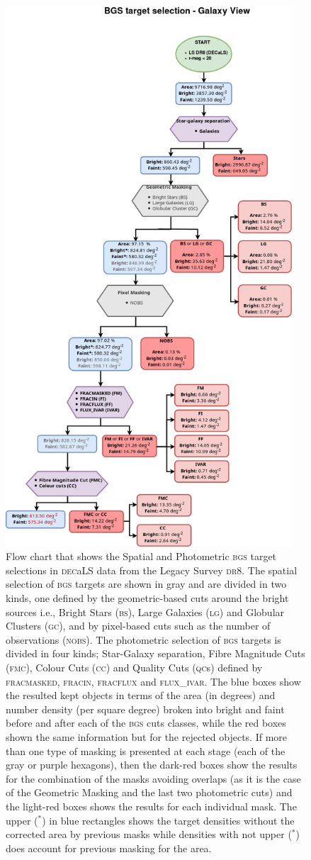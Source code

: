 \documentclass[fleqn,usenatbib]{mnras}
\newcommand{\BGS}{\textsc{bgs}\xspace}
\newcommand{\BS}{\textsc{bs}\xspace}
\newcommand{\CC}{\textsc{cc}\xspace}
\newcommand{\DECaLS}{\textsc{dec}a\textsc{LS}\xspace}
\newcommand{\DReight}{\textsc{dr8}\xspace}
\newcommand{\FLUXIVAR}{{\textsc{ flux\_ivar}}\xspace}
\newcommand{\FMC}{{\textsc{fmc}}\xspace}
\newcommand{\FRACMASKED}{{\textsc{fracmasked}}\xspace}
\newcommand{\FRACFLUX}{{\textsc{fracflux}}\xspace}
\newcommand{\FRACIN}{{\textsc{fracin}}\xspace}
\newcommand{\GC}{\textsc{gc}\xspace}
\newcommand{\LG}{\textsc{lg}\xspace}
\newcommand{\NOBS}{\textsc{nobs}\xspace}
\newcommand{\QCs}{\textsc{qc}s\xspace}
\begin{document}
\begin{figure}
	\includegraphics[width=10.7cm]{images/flow_galaxy.png}
    \caption{Flow chart that shows the Spatial and Photometric \BGS target selections in \DECaLS data from the Legacy Survey \DReight. The spatial selection of \BGS targets are shown in gray and are divided in two kinds, one defined by the geometric-based cuts around the bright sources i.e., Bright Stars (\BS), Large Galaxies (\LG) and Globular Clusters (\GC), and by pixel-based cuts such as the number of observations (\NOBS). The photometric selection of \BGS targets is divided in four kinds; Star-Galaxy separation, Fibre Magnitude Cuts (\FMC), Colour Cuts (\CC) and Quality Cuts (\QCs) defined by \FRACMASKED, \FRACIN, \FRACFLUX and \FLUXIVAR. The blue boxes show the resulted kept objects in terms of the area (in degrees) and number density (per square degree) broken into bright and faint before and after each of the \BGS cuts classes, while the red boxes shown the same information but for the rejected objects. If more than one type of masking is presented at each stage (each of the gray or purple hexagons), then the dark-red boxes show the results for the combination of the masks avoiding overlaps (as it is the case of the Geometric Masking and the last two photometric cuts) and the light-red boxes shows the results for each individual mask. The upper ($^*$) in blue rectangles shows the target densities without the corrected area by previous masks while densities with not upper ($^*$) does account for previous masking for the area.}

\end{figure}
\end{document}
